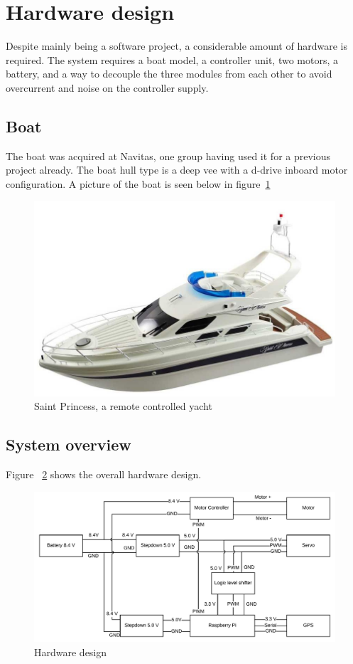 \section{Hardware design}

Despite mainly being a software project, a considerable amount of hardware is required. The system requires a boat model, a controller unit, two motors, a battery, and a way to decouple the three modules from each other to avoid overcurrent and noise on the controller supply. 

\subsection{Boat}

The boat was acquired at Navitas, one group having used it for a previous project already. The boat hull type is a deep vee\cite{hull-types} with a d-drive inboard motor configuration\cite{motor_config}. A picture of the boat is seen below in figure~\ref{fig:saintprincess}

\begin{figure}[H]
\centering
\includegraphics[width=0.5\linewidth]{saint_princess}
\caption{Saint Princess, a remote controlled yacht\cite{saint_princess}}
\label{fig:saintprincess}
\end{figure}

\subsection{System overview}

Figure ~\ref{fig:hardware_design} shows the overall hardware design. 

\begin{figure}[H]
\centering
\includegraphics[width=1\linewidth]{Hardware_design}
\caption{Hardware design}
\label{fig:hardware_design}
\end{figure}

